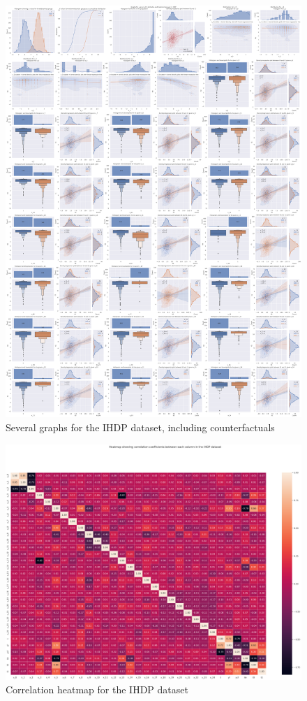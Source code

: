 \documentclass{article}
\begin{document}
\begin{figure}[tb]
\centering
\includegraphics[width=1\textwidth]{project/data/ihdp_graphs.pdf}
\caption{\label{fig:ihdpgraphs}Several graphs for the IHDP dataset, including counterfactuals}
\end{figure}


\begin{figure}[tb]
\centering
\includegraphics[width=1\textwidth]{project/data/ihdp_heatmap.pdf}
\caption{\label{fig:ihdp_correlation}Correlation heatmap for the IHDP dataset}
\end{figure}
\end{document}
